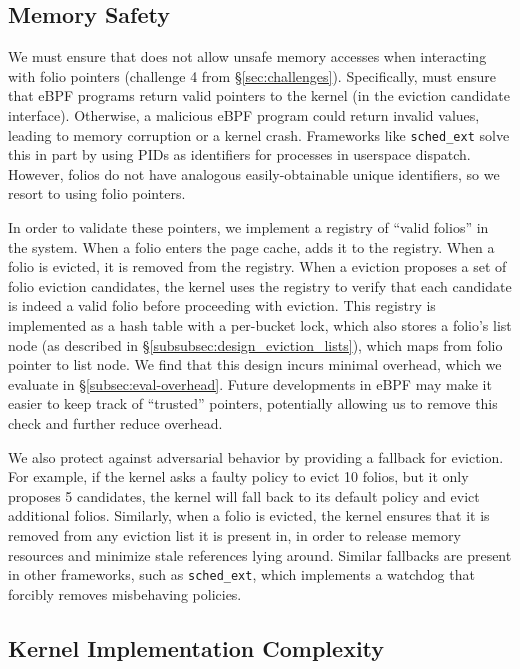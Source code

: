\subsection{Memory Safety}
\label{subsec:design_safe_memory_referencing}

We must ensure that \name does not allow unsafe memory accesses when interacting with folio pointers (challenge 4 from \S\ref{sec:challenges}). Specifically, \name must ensure that eBPF programs return valid pointers to the kernel (\ie in the eviction candidate interface). Otherwise, a malicious eBPF program could return invalid values, leading to memory corruption or a kernel crash. Frameworks like \texttt{sched\_ext} solve this in part by using PIDs as identifiers for processes in userspace dispatch. However, folios do not have analogous easily-obtainable unique identifiers, so we resort to using folio pointers.

In order to validate these pointers, we implement a registry of ``valid folios'' in the system. When a folio enters the page cache, \name adds it to the registry. When a folio is evicted, it is removed from the registry. When a \name eviction proposes a set of folio eviction candidates, the kernel uses the registry to verify that each candidate is indeed a valid folio before proceeding with eviction. This registry is implemented as a hash table with a per-bucket lock, which also stores a folio's list node (as described in \S\ref{subsubsec:design_eviction_lists}), which maps from folio pointer to list node. We find that this design incurs minimal overhead, which we evaluate in \S\ref{subsec:eval-overhead}. Future developments in eBPF may make it easier to keep track of ``trusted'' pointers, potentially allowing us to remove this check and further reduce overhead.

We also protect against adversarial behavior by providing a fallback for eviction. For example, if the kernel asks a faulty policy to evict 10 folios, but it only proposes 5 candidates, the kernel will fall back to its default policy and evict additional folios. Similarly, when a folio is evicted, the kernel ensures that it is removed from any eviction list it is present in, in order to release memory resources and minimize stale references lying around. Similar fallbacks are present in other frameworks, such as \texttt{sched\_ext}, which implements a watchdog that forcibly removes misbehaving policies.




\subsection{Kernel Implementation Complexity}
\label{subsec:kernel-complexity}

